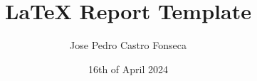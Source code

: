 \documentclass[]{iisreport}
\title{\LaTeX{} Report Template}
\author{Jose Pedro Castro Fonseca}
\date{16th of April 2024}
\begin{document}
\frontmatter





\tableofcontents

\mainmatter








\appendix



\backmatter


\listofacronyms

\listoffigures
\listoftables


\end{document}
